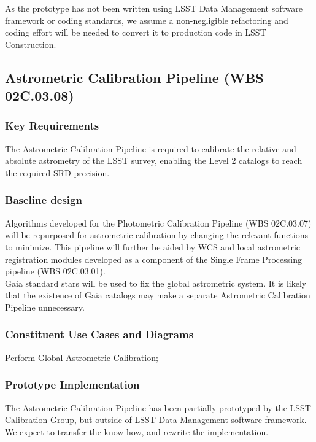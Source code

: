 \documentclass[12pt]{article}
\newcommand{\wbsSFM}{WBS 02C.03.01}
\newcommand{\wbsPhotoCal}{WBS 02C.03.07}
\newcommand{\wbsAstroCal}{WBS 02C.03.08}
\begin{document}
As the prototype has not been written using LSST Data Management software framework or coding standards, we assume a non-negligible refactoring and coding effort will be needed to convert it to production code in LSST Construction.

\clearpage

\subsection{Astrometric Calibration Pipeline (\wbsAstroCal)}

\subsubsection{Key Requirements}

The Astrometric Calibration Pipeline is required to calibrate the relative and absolute astrometry of the LSST survey, enabling the Level 2 catalogs to reach the required SRD precision.

\subsubsection{Baseline design}

Algorithms developed for the Photometric Calibration Pipeline (\wbsPhotoCal) will be repurposed for astrometric calibration by changing the relevant functions to minimize. This pipeline will further be aided by WCS and local astrometric registration modules developed as a component of the Single Frame Processing pipeline (\wbsSFM).
\\

Gaia standard stars will be used to fix the global astrometric system. It is likely that the existence of Gaia catalogs may make a separate Astrometric Calibration Pipeline unnecessary.

\subsubsection{Constituent Use Cases and Diagrams}

Perform Global Astrometric Calibration;

\subsubsection{Prototype Implementation}

The Astrometric Calibration Pipeline has been partially prototyped by the LSST Calibration Group, but outside of LSST Data Management software framework. We expect to transfer the know-how, and rewrite the implementation.
\end{document}

